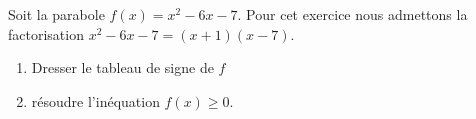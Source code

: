 
\begin{exercice}\label{exoPremiere-0098}

    Soit la parabole \( f(x)=x^2-6x-7\). Pour cet exercice nous admettons la factorisation \( x^2-6x-7=(x+1)(x-7)\). 
        \begin{enumerate}
            \item
                Dresser le tableau de signe de \( f\) 
            \item
                résoudre l'inéquation \( f(x)\geq 0\).
        \end{enumerate}

\end{exercice}

